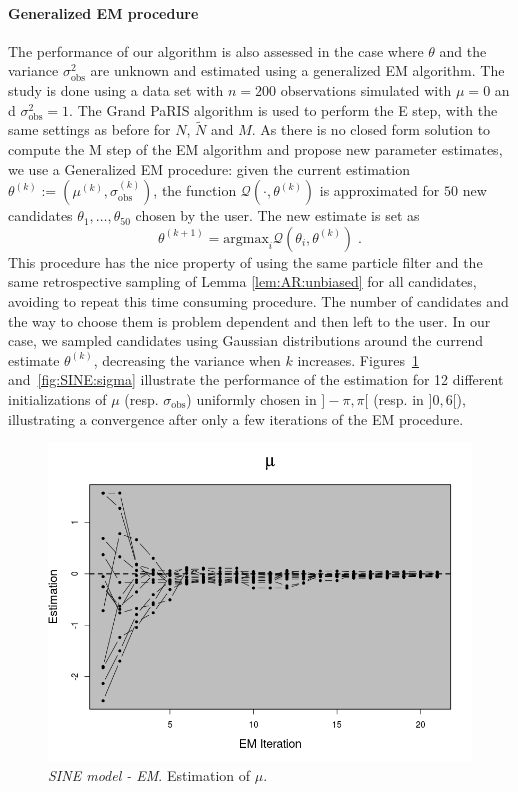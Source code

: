 \documentclass[12pt]{article}
\newcommand{\eqsp}{\;}
\newcommand{\1}{\mathrm{1}}
\begin{document}
\paragraph{Generalized EM procedure}
The performance of our algorithm is also assessed in the case where $\theta$ and the variance $\sigma^2_\text{obs}$ are unknown and estimated using a generalized EM algorithm. 
The study is done using a data set with $n = 200$ observations simulated with $\mu=0$ an d $ \sigma^2_\text{obs} = 1$. The Grand PaRIS algorithm is used to perform the E step, with the same settings as before for $N$, $\tilde{N}$ and $M$.
As there is no closed form solution to compute the M step of the EM algorithm and propose new parameter estimates, we use a Generalized EM procedure: given the current estimation $\theta^{(k)} := \left(\mu^{(k)}, \sigma_{\text{obs}}^{(k)} \right)$, the function $\mathcal{Q}(\cdot, \theta^{(k)})$ is approximated for $50$ new candidates $\theta_1, \dots, \theta_{50} $ chosen by the user. The new estimate is set as
\[
\theta^{(k + 1)} = \text{argmax}_i\mathcal{Q}(\theta_i, \theta^{(k)})\eqsp .
\]
This procedure has the nice property of using the same particle filter and the same retrospective sampling of Lemma \ref{lem:AR:unbiased} for all candidates, avoiding to repeat this time consuming procedure. 
The number of candidates and the way to choose them is problem dependent and then left to the user. 
In our case, we sampled candidates using Gaussian distributions around the currend estimate $\theta^{(k)}$, decreasing the variance when $k$ increases.
Figures~\ref{fig:SINE:theta} and~\ref{fig:SINE:sigma} illustrate the performance of the estimation for 12 different initializations of $\mu$ (resp. $\sigma_\text{obs}$) uniformly chosen in  $]-\pi,\pi[$ (resp. in $]0,6[$), illustrating a convergence after only a few iterations of the EM procedure.

\begin{figure}[p]
\centering
\includegraphics[scale=0.5]{figure_theta}
\caption{{\em SINE model - EM}. Estimation  of $\mu$.}
\label{fig:SINE:theta}
\end{figure}
\end{document}
